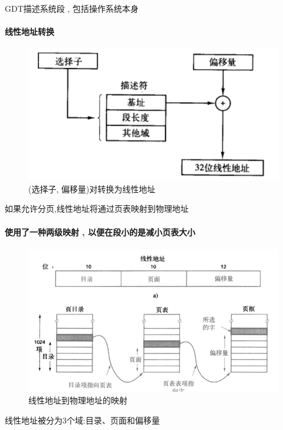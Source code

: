 \documentclass[UTF8,a4paper]{ctexart}
\begin{document}
GDT描述系统段 , 包括操作系统本身

\paragraph{线性地址转换}
\begin{figure}[H]
	\centering
	\includegraphics[scale = 0.5]{assets/ModernOperatingSystems/2018-01-10-23-41-30.png}
	\caption{(选择子, 偏移量)对转换为线性地址}
\end{figure}

 如果允许分页,线性地址将通过页表映射到物理地址
 
 \paragraph{使用了一种两级映射 , 以便在段小的是减小页表大小}
 \begin{figure}[H]
	 \centering
	 \includegraphics[scale = 0.5]{assets/ModernOperatingSystems/2018-01-10-23-45-29.png}
	 \caption{线性地址到物理地址的映射}
 \end{figure}

 线性地址被分为3个域:目录、页面和偏移量
\end{document}
